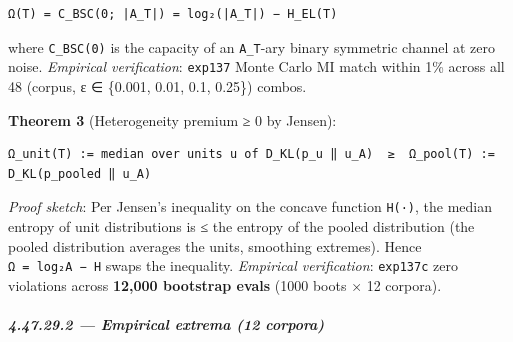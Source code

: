 \documentclass[
]{article}
\begin{document}
\begin{verbatim}
Ω(T) = C_BSC(0; |A_T|) = log₂(|A_T|) − H_EL(T)
\end{verbatim}

where \texttt{C\_BSC(0)} is the capacity of an
\texttt{\textbar{}A\_T\textbar{}}-ary binary symmetric channel at zero
noise. \emph{Empirical verification}: \texttt{exp137} Monte Carlo MI
match within 1\% across all 48 (corpus, ε ∈ \{0.001, 0.01, 0.1, 0.25\})
combos.

\textbf{Theorem 3} (Heterogeneity premium ≥ 0 by Jensen):

\begin{verbatim}
Ω_unit(T) := median over units u of D_KL(p_u ‖ u_A)  ≥  Ω_pool(T) := D_KL(p_pooled ‖ u_A)
\end{verbatim}

\emph{Proof sketch}: Per Jensen's inequality on the concave function
\texttt{H(·)}, the median entropy of unit distributions is ≤ the entropy
of the pooled distribution (the pooled distribution averages the units,
smoothing extremes). Hence
\texttt{Ω\ =\ log₂\textbar{}A\textbar{}\ −\ H} swaps the inequality.
\emph{Empirical verification}: \texttt{exp137c} zero violations across
\textbf{12,000 bootstrap evals} (1000 boots × 12 corpora).

\subparagraph{4.47.29.2 --- Empirical extrema (12
corpora)}\label{empirical-extrema-12-corpora}
\end{document}
